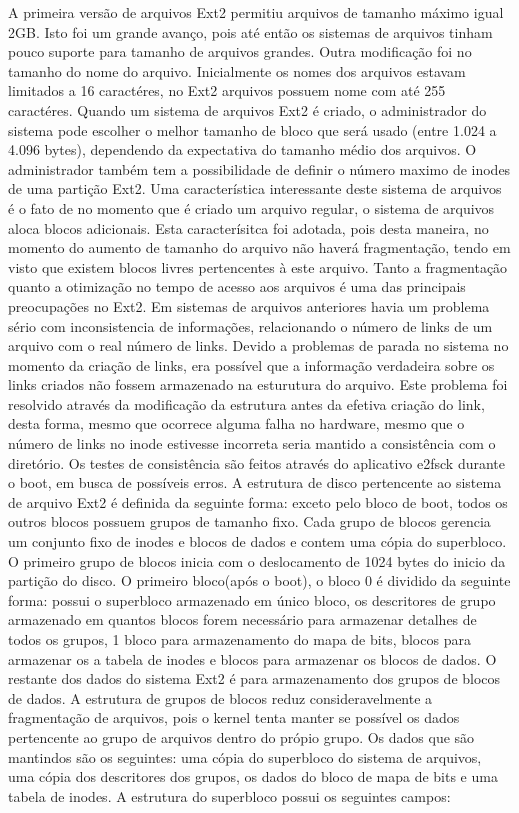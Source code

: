 A primeira versão de arquivos Ext2 permitiu arquivos de tamanho máximo igual 2GB. Isto foi um grande avanço, pois até então os sistemas de arquivos tinham pouco suporte para tamanho de arquivos grandes. Outra modificação foi no tamanho do nome do arquivo. Inicialmente os nomes dos arquivos estavam limitados a 16 caractéres, no Ext2 arquivos possuem nome com até 255 caractéres. 
Quando um sistema de arquivos Ext2 é criado, o administrador do sistema pode escolher o melhor tamanho de bloco que será usado (entre 1.024 a 4.096 bytes), dependendo da expectativa do tamanho médio dos arquivos. O administrador também tem a possibilidade de definir o número maximo de inodes de uma partição Ext2.
Uma característica interessante deste sistema de arquivos é o fato de no momento que é criado um arquivo regular, o sistema de arquivos aloca blocos adicionais. Esta caracterísitca foi adotada, pois desta maneira, no momento do aumento de tamanho do arquivo não haverá fragmentação, tendo em visto que existem blocos livres pertencentes à este arquivo. Tanto a fragmentação quanto a otimização no tempo de acesso aos arquivos é uma das principais preocupações no Ext2.
Em sistemas de arquivos anteriores havia um problema sério com inconsistencia de informações, relacionando o número de links de um arquivo com o real número de links. Devido a problemas de parada no sistema no momento da criação de links, era possível que a informação verdadeira sobre os links criados não fossem armazenado na esturutura do arquivo. Este problema foi resolvido através da modificação da estrutura antes da efetiva criação do link, desta forma, mesmo que ocorrece alguma falha no hardware, mesmo que o número de links no inode estivesse incorreta seria mantido a consistência com o diretório. Os testes de consistência são feitos através do aplicativo e2fsck durante o boot, em busca de possíveis erros.
A estrutura de disco pertencente ao sistema de arquivo Ext2 é definida da seguinte forma: exceto pelo bloco de boot, todos os outros blocos possuem grupos de tamanho fixo. Cada grupo de blocos gerencia um conjunto fixo de inodes e blocos de dados e contem uma cópia do superbloco. O primeiro grupo de blocos inicia com o deslocamento de 1024 bytes do inicio da partição do disco.
O primeiro bloco(após o boot), o bloco 0 é dividido da seguinte forma: possui o superbloco armazenado em único bloco, os descritores de grupo armazenado em quantos blocos forem necessário para armazenar detalhes de todos os grupos, 1 bloco para armazenamento do mapa de bits, blocos para armazenar os a tabela de inodes e blocos para armazenar os blocos de dados.  O restante dos dados do sistema Ext2 é para armazenamento dos grupos de blocos de dados.
A estrutura de grupos de blocos reduz consideravelmente a fragmentação de arquivos, pois o kernel tenta manter se possível os dados pertencente ao grupo de arquivos dentro do própio grupo. 
Os dados que são mantindos são os seguintes: uma cópia do superbloco do sistema de arquivos, uma cópia dos descritores dos grupos, os dados do bloco de mapa de bits e uma tabela de inodes. A estrutura do superbloco possui os seguintes campos:

